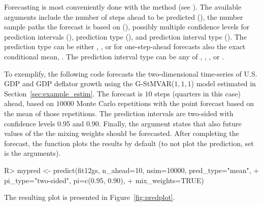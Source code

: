 \documentclass[nojss]{jss}
\begin{document}
Forecasting is most conveniently done with the  method (see ). The available arguments include the number of steps ahead to be predicted (), the number sample paths the forecast is based on (), possibly multiple confidence levels for prediction intervals (), prediction type (), and prediction interval type (). The prediction type can be either , , or for one-step-ahead forecasts also the exact conditional mean, . The prediction interval type can be any of , , , or .

To exemplify, the following code forecasts the two-dimensional time-series of U.S. GDP and GDP deflator growth using the G-StMVAR($1, 1, 1$) model  estimated in Section~\ref{sec:example_estim}. The forecast is $10$ steps (quarters in this case) ahead, based on $10000$ Monte Carlo repetitions with the point forecast based on the mean of those repetitions. The prediction intervals are two-sided with confidence levels $0.95$ and $0.90$. Finally, the argument  states that also future values of the the mixing weights should be forecasted. After completing the forecast, the function plots the results by default (to not plot the prediction, set  is the arguments).
%
\begin{CodeChunk}
\begin{CodeInput}
R> mypred <- predict(fit12gs, n_ahead=10, nsim=10000, pred_type="mean",
+                    pi_type="two-sided", pi=c(0.95, 0.90),
+                    mix_weights=TRUE)
\end{CodeInput}
\end{CodeChunk}
%
The resulting plot is presented in Figure~\ref{fig:predplot}.
\end{document}
